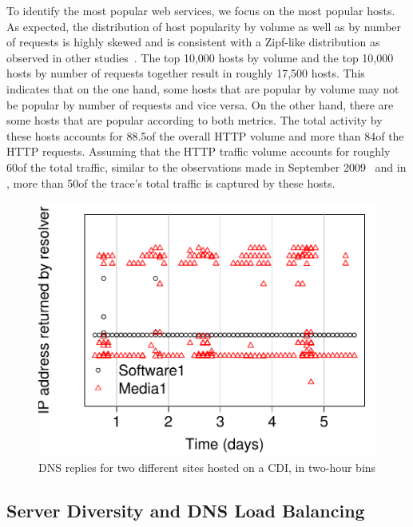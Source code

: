 To identify the most popular web services, we focus on the most popular hosts.
As expected, the distribution of host popularity by volume as well as by number
of requests is highly skewed and is consistent with a Zipf-like distribution as
observed in other studies~\cite{OnDominantCharacteristics2009}. The top 10,000
hosts by volume and the top 10,000 hosts by number of requests together result
in roughly 17,500 hosts.  This indicates that on the one hand, some hosts that
are popular by volume may not be popular by number of requests and vice versa.
On the other hand, there are some hosts that are popular according to both
metrics.  The total activity by these hosts accounts for 88.5\perc of the
overall HTTP volume and more than 84\perc of the HTTP requests. Assuming that
the HTTP traffic volume accounts for roughly 60\perc of the total traffic,
similar to the observations made in September 2009~\cite{OnDominantCharacteristics2009,UGCcacheability} 
and in \martrace, more than 50\perc of the trace's total traffic is captured by
these hosts.

\begin{figure}[htbp]
  \centering
  \includegraphics[height=0.7\linewidth]{figures-pdf/dns-diversity}
  \caption{DNS replies for two different sites hosted on a CDI, in two-hour bins}%
  \label{fig:dns_diversity}
\end{figure}


\subsection{Server Diversity and DNS Load Balancing}\label{sec:active_dns_measurement} 


